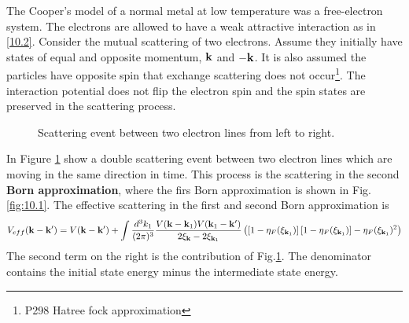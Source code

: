 The Cooper's model of a normal metal at low temperature was a free-electron system.
The electrons are allowed to have a weak attractive interaction as in \eqref{10.2}.
Consider the mutual scattering of two electrons.
Assume they initially have states of equal and opposite momentum, $\mathbf{k}$ and $-\mathbf{k}$.
It is also assumed the particles have opposite spin that exchange scattering does not occur\footnote{P298 Hatree fock approximation}.
The interaction potential does not flip the electron spin and the spin states are preserved in the scattering process.

\begin{figure}[ht]
    \centering
    \caption{Scattering event between two electron lines from left to right.}%
    \label{fig:10.2}
\end{figure}
In Figure \ref{fig:10.2} show a double scattering event between two electron lines which are moving in the same direction in time.
This process is the scattering in the second \textbf{Born approximation}, where the firs Born approximation is shown in Fig.\ref{fig:10.1}.
The effective scattering in the first and second Born approximation is
\begin{equation}
    V_{eff}(\mathbf{k}-\mathbf{k}') = V(\mathbf{k}-\mathbf{k}') + \int \frac{d^3 k_1}{(2\pi)^3} \frac{V(\mathbf{k}-\mathbf{k}_1) V(\mathbf{k}_1- \mathbf{k}')}{2\xi_{\mathbf{k}} - 2 \xi_{\mathbf{k}_1}} \left( \left[1-\eta_F(\xi_{\mathbf{k}_1}) \right] \left[ 1- \eta_F(\xi_{\mathbf{k}_1}) \right] - \eta_F(\xi_{\mathbf{k}_1})^2 \right)   \label{10.3}
\end{equation}
The second term on the right is the contribution of Fig.\ref{fig:10.2}.
The denominator contains the initial state energy minus the intermediate state energy.
